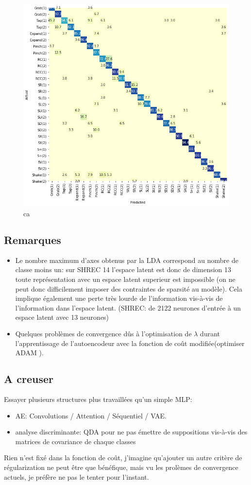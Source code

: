\begin{figure}[H]
    \centering
    \includegraphics[width=0.8\linewidth]{Images/shrec28.png}
    \caption{ca}
    \label{fig:rsshrec28}
\end{figure}\textbf{}

\subsection{Remarques}
\begin{itemize}
    \item Le nombre maximum d'axes obtenus par la LDA correspond au nombre de classe moins un: sur SHREC 14 l'espace latent est donc de dimension 13 toute représentation avec un espace latent superieur est impossible (on ne peut donc difficilement imposer des contraintes de sparsité au modèle). Cela implique également une perte très lourde de l'information vis-à-vis de l'information dans l'espace latent. (SHREC: de 2122 neurones d'entrée à un espace latent avec 13 neurones)
    \item Quelques problèmes de convergence dûs à l'optimisation de $\lambda$ durant l'apprentissage de l'autoencodeur avec la fonction de coût modifiée(optimiser ADAM \cite{kingma2014adam}).
\end{itemize}

\subsection{A creuser}

Essayer plusieurs structures plus travaillées qu'un simple MLP:
\begin{itemize}
    \item AE: Convolutions / Attention / Séquentiel / VAE.
    \item analyse discriminante: QDA  pour ne pas émettre de suppositions vis-à-vis des matrices de covariance de chaque classes
\end{itemize}

Rien n'est fixé dans la fonction de coût, j'imagine qu'ajouter un autre critère de régularization ne peut être que bénéfique, mais vu les prolèmes de convergence actuels, je préfère ne pas le tenter pour l'instant.


